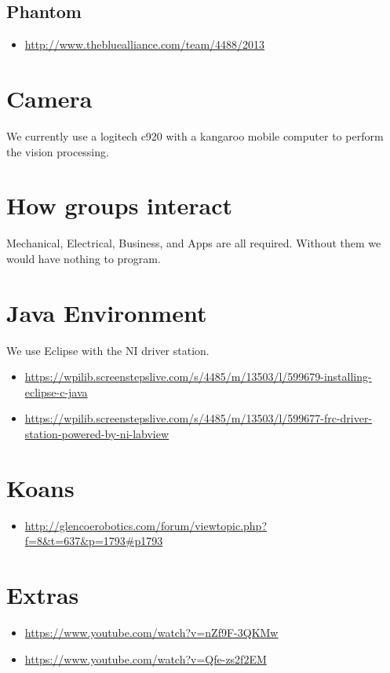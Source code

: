 \documentclass{article}
\begin{document}
\subsection{Phantom}
\begin{itemize}
\item[] \url{http://www.thebluealliance.com/team/4488/2013}
\end{itemize}



\section{Camera}
We currently use a logitech c920 with a kangaroo mobile computer to perform the vision processing.

\section{How groups interact}
Mechanical, Electrical, Business, and Apps are all required. Without them we would have nothing to program.

\section{Java Environment}
We use Eclipse with the NI driver station.

\begin{itemize}
\item[] \url{https://wpilib.screenstepslive.com/s/4485/m/13503/l/599679-installing-eclipse-c-java}
\item[] \url{https://wpilib.screenstepslive.com/s/4485/m/13503/l/599677-frc-driver-station-powered-by-ni-labview}
\end{itemize}

\section{Koans}
\begin{itemize}
    \item[] \url{http://glencoerobotics.com/forum/viewtopic.php?f=8&t=637&p=1793#p1793}
\end{itemize}

\section{Extras}
\begin{itemize}
\item[] \url{https://www.youtube.com/watch?v=nZf9F-3QKMw}
\item[] \url{https://www.youtube.com/watch?v=Qfe-zs2f2EM}
\end{itemize}
\end{document}

